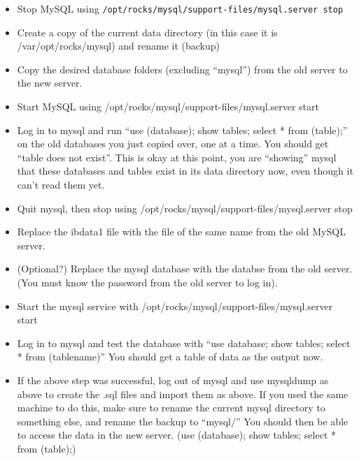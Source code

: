 \documentclass[12pt]{article}
\begin{document}
\begin{itemize}
\item Stop MySQL using {\tt /opt/rocks/mysql/support-files/mysql.server stop}
\item Create a copy of the current data directory (in this case it is /var/opt/rocks/mysql) and rename it (backup)
\item Copy the desired database folders (excluding ``mysql'') from the old server to the new server.
\item Start MySQL using /opt/rocks/mysql/support-files/mysql.server start
\item Log in to mysql and run ``use (database); show tables; select * from (table);'' on the old databases you just copied over, one at a time. You should get ``table does not exist''. This is okay at this point, you are ``showing'' mysql that these databases and tables exist in its data directory now, even though it can't read them yet. 
\item Quit mysql, then stop using /opt/rocks/mysql/support-files/mysql.server stop
\item Replace the ibdata1 file with the file of the same name from the old MySQL server.
\item (Optional?) Replace the mysql database with the databse from the old server. (You must know the password from the old server to log in). 
\item Start the mysql service with /opt/rocks/mysql/support-files/mysql.server start
\item Log in to mysql and test the database with ``use database; show tables; select * from (tablename)'' You should get a table of data as the output now.
\item If the above step was successful, log out of mysql and use mysqldump as above to create the .sql files and import them as above. If you used the same machine to do this, make sure to rename the current mysql directory to something else, and rename the backup to ``mysql/''
  You should then be able to access the data in the new server. (use (database); show tables; select * from (table);)
\end{itemize}
\end{document}
